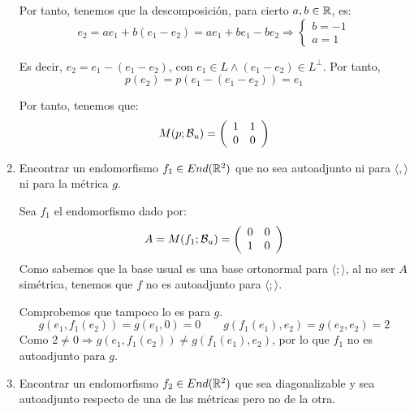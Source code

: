\begin{ejercicio}
\begin{enumerate}
        Por tanto, tenemos que la descomposición, para cierto $a,b\in \mathbb{R}$, es:
        \begin{equation*}
            e_2 = ae_1 +b(e_1-e_2)=ae_1+be_1-be_2 \Longrightarrow \left\{\begin{array}{c}
                 b=-1 \\ a=1
            \end{array}\right.
        \end{equation*}

        Es decir, $e_2=e_1-(e_1-e_2)$, con $e_1\in L\land (e_1-e_2)\in L^\perp$. Por tanto,
        \begin{equation*}
            p(e_2)=p(e_1-(e_1-e_2)) = e_1
        \end{equation*}

        Por tanto, tenemos que:
        \begin{equation*}
            M(p;\mathcal{B}_u)=\left(\begin{array}{cc}
                1 & 1 \\
                0 & 0
            \end{array}\right)
        \end{equation*}


    \item Encontrar un endomorfismo $f_1\in End(\mathbb{R}^2)$ que no sea autoadjunto ni para $\langle,\rangle$ ni para la métrica $g$.

    Sea $f_1$ el endomorfismo dado por:
    \begin{equation*}
        A=M(f_1;\mathcal{B}_u)=\left(\begin{array}{cc}
        0 & 0 \\
        1 & 0
    \end{array}\right)
    \end{equation*}
    Como sabemos que la base usual es una base ortonormal para $\langle;\rangle$, al no ser $A$ simétrica, tenemos que $f$ no es autoadjunto para $\langle;\rangle$.

    Comprobemos que tampoco lo es para $g$.
    \begin{equation*}
        g(e_1, f_1(e_2))=g(e_1, 0)=0
        \qquad
        g(f_1(e_1), e_2)=g(e_2, e_2)=2
    \end{equation*}
    Como $2\neq 0 \Longrightarrow g(e_1, f_1(e_2))\neq g(f_1(e_1), e_2)$, por lo que $f_1$ no es autoadjunto para $g$.


    \item Encontrar un endomorfismo $f_2\in End(\mathbb{R}^2)$ que sea diagonalizable y sea autoadjunto respecto de una de las métricas pero no de la otra.


\end{enumerate}
\end{ejercicio}
